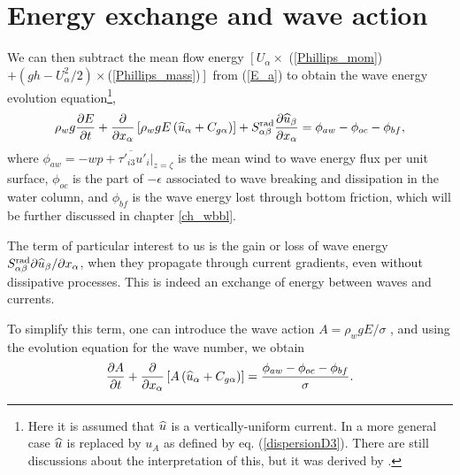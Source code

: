 \section{Energy exchange and wave action}
We can then subtract the mean flow energy $\left[ U_\alpha \times \right.$ (\ref{Phillips_mom})$+ (gh - U_\alpha^2/2 )\times $(\ref{Phillips_mass})$\left.\right]$ 
from (\ref{E_a}) to obtain the wave energy evolution equation\footnote{Here it is assumed that  $\widehat{u}$ is a vertically-uniform current. 
In a more general case $\widehat{u}$ is replaced by $u_A$ as defined by eq.  
(\ref{dispersionD3}). There are still discussions about the interpretation of this, but it was derived by \cite{Andrews&McIntyre1978b}.}, 
\begin{equation}
 \rho_w g \frac{\partial E}{\partial t}+ \frac{\partial }{\partial x_\alpha}\left[\rho_w g E \left(\widehat{u}_\alpha + C_{g \alpha}\right)\right]
+  S^{\mathrm{rad}}_{\alpha \beta} \frac{\partial \widehat{u}_\beta}{\partial x_\alpha}  = \phi_{aw} - \phi_{oc} - \phi_{bf},\label{ewave}
\end{equation}
where $\phi_{aw}=- \overline{\left. w  p + \tau'_{i 3} u'_i \right|_{z=\zeta}}$ is the mean wind to wave energy flux per unit surface, 
$\phi_{oc}$ is the part of $-\epsilon$ associated to wave breaking and dissipation in the water column, and 
$\phi_{bf}$ is the wave energy lost through bottom friction, which will be further discussed in  chapter \ref{ch_wbbl}.

The term of particular interest to us is the gain or loss of wave energy  $S^{\mathrm{rad}}_{\alpha \beta} {\partial \widehat{u}_\beta}/{\partial x_\alpha}$,
when they propagate through current gradients, even without dissipative processes. This is indeed an exchange of energy between waves and currents. 

To simplify this term, one can introduce the wave action $A=\rho_w g E/\sigma$ \citep{Bretherton&Garrett1968,Andrews&McIntyre1978b}, and using 
the evolution equation for the wave number, we obtain \citep[see][for details]{Phillips1977}
\begin{equation}
\frac{\partial A}{\partial t}+ \frac{\partial }{\partial x_\alpha}\left[A\left(\widehat{u}_\alpha + C_{g \alpha}\right)\right]
   = \frac{\phi_{aw} - \phi_{oc} - \phi_{bf}}{\sigma}.\label{awave}
\end{equation}

